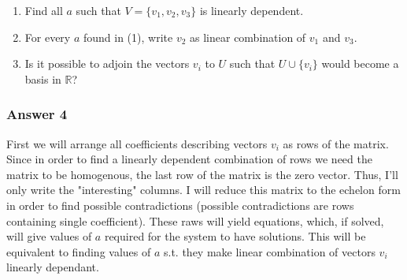 \documentclass[11pt]{article}
\begin{document}
\begin{enumerate}
\item Find all $a$ such that $V = \{v_1, v_2, v_3\}$ is linearly dependent.
\item For every $a$ found in (1), write $v_2$ as linear combination of $v_1$
and $v_3$.
\item Is it possible to adjoin the vectors $v_i$ to $U$ such that 
      $U \cup \{v_i\}$ would become a basis in $\mathbb{R}$?
\end{enumerate}

\subsubsection{Answer 4}
\label{sec-1-4-1}

First we will arrange all coefficients describing vectors $v_i$ as rows of
the matrix.  Since in order to find a linearly dependent combination of rows
we need the matrix to be homogenous, the last row of the matrix is the zero
vector.  Thus, I'll only write the "interesting" columns.  I will reduce
this matrix to the echelon form in order to find possible contradictions
(possible contradictions are rows containing single coefficient).  These
raws will yield equations, which, if solved, will give values of $a$ required
for the system to have solutions.  This will be equivalent to finding values
of $a$ s.t. they make linear combination of vectors $v_i$ linearly dependant.
\end{document}
